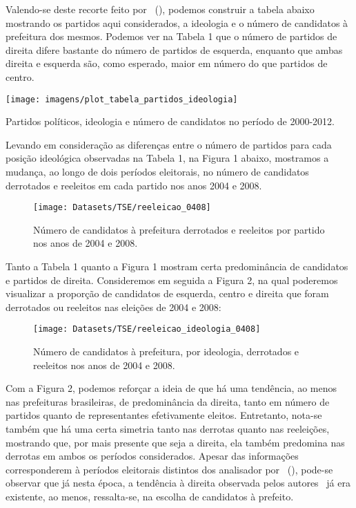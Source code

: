 \documentclass[
	12pt,				%
	openright,			%
	twoside,			%
	a4paper,			%
	openany,
	english,			%
	brazil				%
	]{abntex2}
\begin{document}
Valendo-se deste recorte feito por ~(\citeyear{Bolognesi2022Sep}), podemos construir a tabela abaixo mostrando os partidos aqui considerados, a ideologia e o número de candidatos à prefeitura dos mesmos. Podemos ver na Tabela 1 que o número de partidos de direita difere bastante do número de partidos de esquerda, enquanto que ambas direita e esquerda são, como esperado, maior em número do que partidos de centro.

\begin{table}[htp!]
	\centering
	\hfill\texttt{[image: imagens/plot\_tabela\_partidos\_ideologia]}\hspace{\fill}
	\caption{Partidos políticos, ideologia e número de candidatos no período de 2000-2012.}
	\label{fig:plottabelapartidosideologia}
\end{table}

Levando em consideração as diferenças entre o número de partidos para cada posição ideológica observadas na Tabela 1, na Figura 1 abaixo, mostramos a mudança, ao longo de dois períodos eleitorais, no número de candidatos derrotados e reeleitos em cada partido nos anos 2004 e 2008.

\begin{figure}[htp!]
	\centering
	\hfill\texttt{[image: Datasets/TSE/reeleicao\_0408]}\hspace{\fill}
	\caption{Número de candidatos à prefeitura derrotados e reeleitos por partido nos anos de 2004 e 2008.}
	\label{fig:reelecao0408}
\end{figure}

Tanto a Tabela 1 quanto a Figura 1 mostram certa predominância de candidatos e partidos de direita. Consideremos em seguida a Figura 2, na qual poderemos visualizar a proporção de candidatos de esquerda, centro e direita que foram derrotados ou reeleitos nas eleições de 2004 e 2008:

\begin{figure}[htp!]
	\centering
	\hfill\texttt{[image: Datasets/TSE/reeleicao\_ideologia\_0408]}\hspace{\fill}
	\caption{Número de candidatos à prefeitura, por ideologia, derrotados e reeleitos nos anos de 2004 e 2008.}
	\label{fig:reeleicaoideologia0408}
\end{figure}

Com a Figura 2, podemos reforçar a ideia de que há uma tendência, ao menos nas prefeituras brasileiras, de predominância da direita, tanto em número de partidos quanto de representantes efetivamente eleitos. Entretanto, nota-se também que há uma certa simetria tanto nas derrotas quanto nas reeleições, mostrando que, por mais presente que seja a direita, ela também predomina nas derrotas em ambos os períodos considerados. Apesar das informações corresponderem à períodos eleitorais distintos dos analisador por ~(\citeyear{fuks2020afeto}), pode-se observar que já nesta época, a tendência à direita observada pelos autores~\cite{fuks2020afeto} já era existente, ao menos, ressalta-se, na escolha de candidatos à prefeito.
\end{document}
